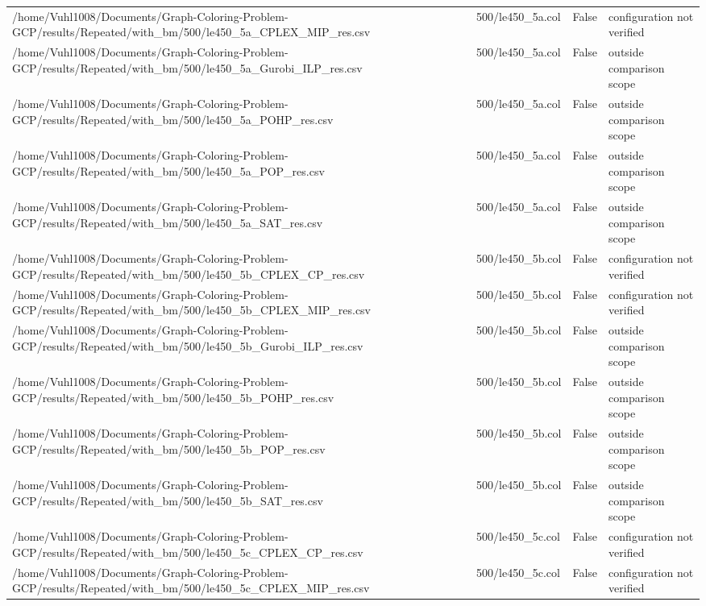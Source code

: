 \begin{table}[htbp]
\begin{tabular}{llll}
/home/Vuhl1008/Documents/Graph-Coloring-Problem-GCP/results/Repeated/with\_bm/500/le450\_5a\_CPLEX\_MIP\_res.csv & 500/le450\_5a.col & False & configuration not verified \\
/home/Vuhl1008/Documents/Graph-Coloring-Problem-GCP/results/Repeated/with\_bm/500/le450\_5a\_Gurobi\_ILP\_res.csv & 500/le450\_5a.col & False & outside comparison scope \\
/home/Vuhl1008/Documents/Graph-Coloring-Problem-GCP/results/Repeated/with\_bm/500/le450\_5a\_POHP\_res.csv & 500/le450\_5a.col & False & outside comparison scope \\
/home/Vuhl1008/Documents/Graph-Coloring-Problem-GCP/results/Repeated/with\_bm/500/le450\_5a\_POP\_res.csv & 500/le450\_5a.col & False & outside comparison scope \\
/home/Vuhl1008/Documents/Graph-Coloring-Problem-GCP/results/Repeated/with\_bm/500/le450\_5a\_SAT\_res.csv & 500/le450\_5a.col & False & outside comparison scope \\
/home/Vuhl1008/Documents/Graph-Coloring-Problem-GCP/results/Repeated/with\_bm/500/le450\_5b\_CPLEX\_CP\_res.csv & 500/le450\_5b.col & False & configuration not verified \\
/home/Vuhl1008/Documents/Graph-Coloring-Problem-GCP/results/Repeated/with\_bm/500/le450\_5b\_CPLEX\_MIP\_res.csv & 500/le450\_5b.col & False & configuration not verified \\
/home/Vuhl1008/Documents/Graph-Coloring-Problem-GCP/results/Repeated/with\_bm/500/le450\_5b\_Gurobi\_ILP\_res.csv & 500/le450\_5b.col & False & outside comparison scope \\
/home/Vuhl1008/Documents/Graph-Coloring-Problem-GCP/results/Repeated/with\_bm/500/le450\_5b\_POHP\_res.csv & 500/le450\_5b.col & False & outside comparison scope \\
/home/Vuhl1008/Documents/Graph-Coloring-Problem-GCP/results/Repeated/with\_bm/500/le450\_5b\_POP\_res.csv & 500/le450\_5b.col & False & outside comparison scope \\
/home/Vuhl1008/Documents/Graph-Coloring-Problem-GCP/results/Repeated/with\_bm/500/le450\_5b\_SAT\_res.csv & 500/le450\_5b.col & False & outside comparison scope \\
/home/Vuhl1008/Documents/Graph-Coloring-Problem-GCP/results/Repeated/with\_bm/500/le450\_5c\_CPLEX\_CP\_res.csv & 500/le450\_5c.col & False & configuration not verified \\
/home/Vuhl1008/Documents/Graph-Coloring-Problem-GCP/results/Repeated/with\_bm/500/le450\_5c\_CPLEX\_MIP\_res.csv & 500/le450\_5c.col & False & configuration not verified \\

\end{tabular}
\end{table}
